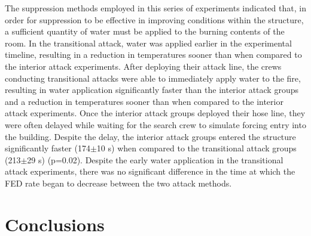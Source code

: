 \documentclass[12pt,oneside]{article}
\begin{document}
The suppression methods employed in this series of experiments indicated that, in order for suppression to be effective in improving conditions within the structure, a sufficient quantity of water must be applied to the burning contents of the room. In the transitional attack, water was applied earlier in the experimental timeline, resulting in a reduction in temperatures sooner than when compared to the interior attack experiments. After deploying their attack line, the crews conducting transitional attacks were able to immediately apply water to the fire, resulting in water application significantly faster than the interior attack groups and a reduction in temperatures sooner than when compared to the interior attack experiments. Once the interior attack groups deployed their hose line, they were often delayed while waiting for the search crew to simulate forcing entry into the building. Despite the delay, the interior attack groups entered the structure significantly faster (174$\pm$10 s) when compared to the transitional attack groups (213$\pm$29 s) (p=0.02). Despite the early water application in the transitional attack experiments, there was no significant difference in the time at which the FED rate began to decrease between the two attack methods. 





\section{Conclusions}
\end{document}

